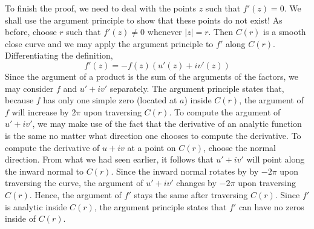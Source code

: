 \documentclass[12pt]{article}
\begin{document}
To finish the proof, we need to deal with the points $z$ such that $f'(z) = 0$.  We shall use the argument principle to show that these points do not exist!  As before, choose $r$ such that $f'(z) \ne 0$ whenever $|z| = r$.  Then $C(r)$ is a smooth close curve and we may apply the argument principle to $f'$ along $C(r)$.  Differentiating the definition,
 $$f'(z) = -f(z) (u'(z) + i v'(z))$$
Since the argument of a product is the sum of the arguments of the factors, we may consider $f$ and $u' + iv'$ separately.  The argument principle states that, because $f$ has only one simple zero (located at $a$) inside $C(r)$, the argument of $f$ will increase by $2 \pi$ upon traversing $C(r)$.  To compute the argument of $u' + iv'$, we may make use of the fact that the derivative of an analytic function is the same no matter what direction one chooses to compute the derivative.  To compute the derivative of $u + i v$ at a point on $C(r)$, choose the normal direction.  From what we had seen earlier, it follows that $u' + iv'$ will point along the inward normal to $C(r)$.  Since the inward normal rotates by by $-2 \pi$ upon traversing the curve, the argument of $u' + iv'$ changes by $-2 \pi$ upon traversing $C(r)$.  Hence, the argument of $f'$ stays the same after traversing $C(r)$.  Since $f'$ is analytic inside $C(r)$, the argument principle states that $f'$ can have no zeros inside of $C(r)$.
\end{document}

